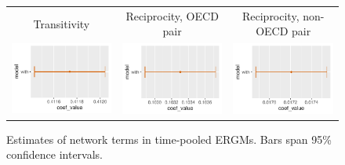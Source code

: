 \documentclass[reqno,onecolumn,letterpaper,12pt]{article}
\begin{document}
\begin{figure}[htp]
\centering
\begin{tabular}{@{\hskip -.05cm}c@{\hskip .2cm}c@{\hskip .2cm}c}
Transitivity  & Reciprocity, OECD pair &Reciprocity, non-OECD pair\\
\includegraphics[height=.165\textheight, clip=true, trim=1.3cm .6cm 0cm .1cm]{SI_figures/TERGM_rl_plots/Transitivity.pdf}   &
\includegraphics[height=.165\textheight, clip=true, trim=1.3cm .6cm 0cm .1cm]{SI_figures/TERGM_rl_plots/Mutuality_OECD_Pair.pdf}    &
\includegraphics[height=.165\textheight, clip=true, trim=1.3cm .6cm 0cm .1cm]{SI_figures/TERGM_rl_plots/Mutuality_Not_OECD_Pair.pdf} \\
\end{tabular}
\caption{\label{fig:net_effects} Estimates of network terms in time-pooled ERGMs. Bars span 95\% confidence intervals.}
\end{figure}
\end{document}
